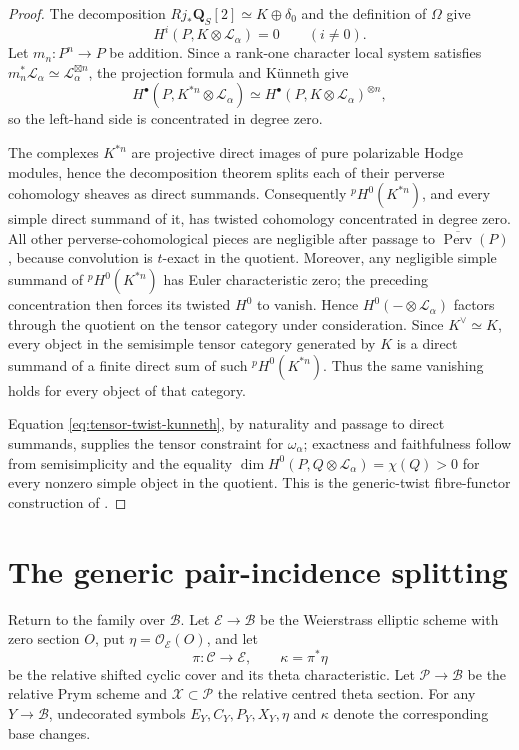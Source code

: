 \documentclass[10pt]{amsart}
\numberwithin{equation}{section}
\theoremstyle{definition}
\theoremstyle{remark}
\newcommand{\QQ}{\mathbf Q}
\newcommand{\cB}{\mathcal B}
\newcommand{\cP}{\mathcal P}
\newcommand{\cX}{\mathcal X}
\newcommand{\cC}{\mathcal C}
\newcommand{\cE}{\mathcal E}
\begin{document}
\begin{proof}
The decomposition
$Rj_*\QQ_S[2]\simeq K\oplus\delta_0$ and the definition of $\Omega$ give
\[
 H^i(P,K\otimes\mathcal L_\alpha)=0\qquad(i\ne0).
\]
Let $m_n:P^n\to P$ be addition.  Since a rank-one character local system
satisfies
$m_n^*\mathcal L_\alpha\simeq\mathcal L_\alpha^{\boxtimes n}$, the
projection formula and K\"unneth give
\begin{equation}
 H^\bullet(P,K^{*n}\otimes\mathcal L_\alpha)
 \simeq
 H^\bullet(P,K\otimes\mathcal L_\alpha)^{\otimes n},
\label{eq:tensor-twist-kunneth}
\end{equation}
so the left-hand side is concentrated in degree zero.

The complexes $K^{*n}$ are projective direct images of pure polarizable
Hodge modules, hence the decomposition theorem splits each of their perverse
cohomology sheaves as direct summands.  Consequently
${}^pH^0(K^{*n})$, and every simple direct summand of it, has twisted
cohomology concentrated in degree zero.  All other perverse-cohomological
pieces are negligible after passage to
$\overline{\operatorname{Perv}}(P)$, because convolution is $t$-exact in
the quotient.  Moreover, any negligible simple summand of
${}^pH^0(K^{*n})$ has Euler characteristic zero; the preceding concentration
then forces its twisted $H^0$ to vanish.  Hence $H^0(-\otimes\mathcal
L_\alpha)$ factors through the quotient on the tensor category under
consideration.  Since $K^\vee\simeq K$, every object in the semisimple tensor
category generated by $K$ is a direct summand of a finite direct sum of such
${}^pH^0(K^{*n})$.  Thus the same vanishing holds for every object of that
category.

Equation \eqref{eq:tensor-twist-kunneth}, by naturality and passage to direct
summands, supplies the tensor constraint for $\omega_\alpha$; exactness and
faithfulness follow from semisimplicity and the equality
$\dim H^0(P,Q\otimes\mathcal L_\alpha)=\chi(Q)>0$ for every nonzero simple
object in the quotient.  This is the generic-twist fibre-functor
construction of \cite[Section~3.1, Proposition~3.1]{KLM2026}.
\end{proof}


\section{The generic pair-incidence splitting}\label{sec:pair-splitting}

Return to the family over $\cB$.  Let $\cE\to\cB$ be the Weierstrass elliptic
scheme with zero section $O$, put $\eta=\mathcal O_{\cE}(O)$, and let
\[
 \pi:\cC\longrightarrow\cE,
 \qquad
 \kappa=\pi^*\eta
\]
be the relative shifted cyclic cover and its theta characteristic.  Let
$\cP\to\cB$ be the relative Prym scheme and $\cX\subset\cP$ the relative
centred theta section.  For any $Y\to\cB$, undecorated symbols
$E_Y,C_Y,P_Y,X_Y,\eta$ and $\kappa$ denote the corresponding base changes.
\end{document}
